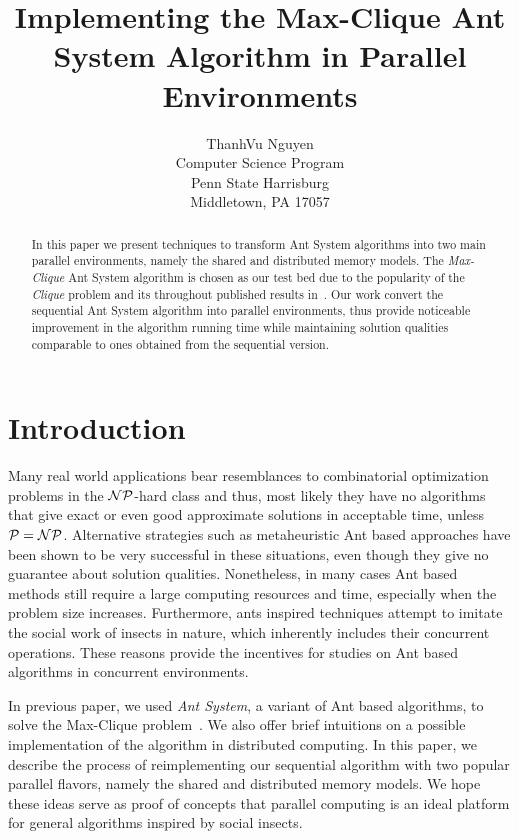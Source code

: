 \documentclass[11pt]{article}
\begin{document}
  

\title{Implementing the Max-Clique Ant System Algorithm in Parallel Environments} 
\author{ 
ThanhVu Nguyen\\ 
Computer Science Program\\ 
Penn State Harrisburg\\ 
Middletown, PA 17057\\ 
}  
\maketitle  


\begin{abstract}
In this paper we present techniques to transform Ant System algorithms into two main parallel environments, namely the shared and distributed memory models. The \textit{Max-Clique} Ant System algorithm is chosen as our test bed due to the popularity of the \textit{Clique} problem and its throughout published results in~\cite{BR}. Our work convert the sequential Ant System algorithm into parallel environments, thus provide noticeable improvement in the algorithm running time while maintaining solution qualities comparable to ones obtained from the sequential version.
\end{abstract}


\section{Introduction}\label{intro}


Many real world applications bear resemblances to combinatorial optimization problems in the $\cal NP$-hard class and thus, most likely they have no algorithms that give exact or even good approximate solutions in acceptable time, unless $\cal P = NP$.  Alternative strategies such as metaheuristic Ant based approaches have been shown to be very successful in these situations, even though they give no guarantee about solution qualities.  Nonetheless, in many cases Ant based methods still require a large computing resources and time, especially when the problem size increases.  Furthermore, ants inspired techniques attempt to imitate the social work of insects in nature, which inherently includes their concurrent operations.  These reasons provide the incentives for studies on Ant based algorithms in concurrent environments.

In previous paper, we used \textit{Ant System}, a variant of Ant based algorithms, to solve the Max-Clique problem~\cite{BR}. We also offer brief intuitions on a possible implementation of the algorithm in distributed computing.  In this paper, we describe the process of reimplementing our sequential algorithm with two popular parallel flavors, namely the shared and distributed memory models. We hope these ideas serve as proof of concepts that parallel computing is an ideal platform for general algorithms inspired by social insects.
\end{document}
